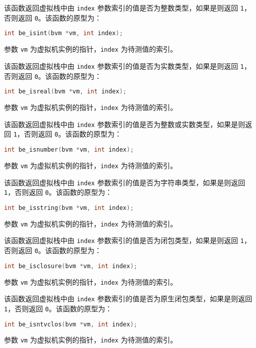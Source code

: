 
该函数返回虚拟栈中由 \texttt{index} 参数索引的值是否为整数类型，如果是则返回 \texttt{1}，否则返回 \texttt{0}。该函数的原型为：
\begin{lstlisting}[language=c, style=berry, numbers=none]
int be_isint(bvm *vm, int index);
\end{lstlisting}
参数 \texttt{vm} 为虚拟机实例的指针，\texttt{index} 为待测值的索引。


该函数返回虚拟栈中由 \texttt{index} 参数索引的值是否为实数类型，如果是则返回 \texttt{1}，否则返回 \texttt{0}。该函数的原型为：
\begin{lstlisting}[language=c, style=berry, numbers=none]
int be_isreal(bvm *vm, int index);
\end{lstlisting}
参数 \texttt{vm} 为虚拟机实例的指针，\texttt{index} 为待测值的索引。


该函数返回虚拟栈中由 \texttt{index} 参数索引的值是否为整数或实数类型，如果是则返回 \texttt{1}，否则返回 \texttt{0}。该函数的原型为：
\begin{lstlisting}[language=c, style=berry, numbers=none]
int be_isnumber(bvm *vm, int index);
\end{lstlisting}
参数 \texttt{vm} 为虚拟机实例的指针，\texttt{index} 为待测值的索引。


该函数返回虚拟栈中由 \texttt{index} 参数索引的值是否为字符串类型，如果是则返回 \texttt{1}，否则返回 \texttt{0}。该函数的原型为：
\begin{lstlisting}[language=c, style=berry, numbers=none]
int be_isstring(bvm *vm, int index);
\end{lstlisting}
参数 \texttt{vm} 为虚拟机实例的指针，\texttt{index} 为待测值的索引。


该函数返回虚拟栈中由 \texttt{index} 参数索引的值是否为闭包类型，如果是则返回 \texttt{1}，否则返回 \texttt{0}。该函数的原型为：
\begin{lstlisting}[language=c, style=berry, numbers=none]
int be_isclosure(bvm *vm, int index);
\end{lstlisting}
参数 \texttt{vm} 为虚拟机实例的指针，\texttt{index} 为待测值的索引。


该函数返回虚拟栈中由 \texttt{index} 参数索引的值是否为原生闭包类型，如果是则返回 \texttt{1}，否则返回 \texttt{0}。该函数的原型为：
\begin{lstlisting}[language=c, style=berry, numbers=none]
int be_isntvclos(bvm *vm, int index);
\end{lstlisting}
参数 \texttt{vm} 为虚拟机实例的指针，\texttt{index} 为待测值的索引。

